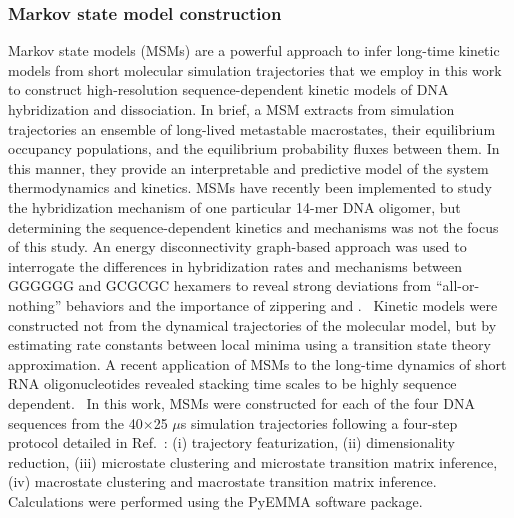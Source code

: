 \documentclass[journal=jpcbfk,manuscript=article]{achemso}
\newcommand*{\rood}[1]{{\color{red}{#1}}}
\begin{document}
\subsubsection{Markov state model construction}

Markov state models (MSMs) are a powerful approach to infer long-time kinetic models from short molecular simulation trajectories \citep{Sengupta2019AutomatedSelf-assembly, Pande2010EverythingAsk, Chodera2014MarkovDynamics, Husic2018MarkovScience, Wehmeyer2019IntroductionSoftware} that we employ in this work to construct high-resolution sequence-dependent kinetic models of DNA hybridization and dissociation. In brief, a MSM extracts from simulation trajectories an ensemble of long-lived metastable macrostates, their equilibrium occupancy populations, and the equilibrium probability fluxes between them. In this manner, they provide an interpretable and predictive model of the system thermodynamics and kinetics. MSMs have recently been implemented to study the hybridization mechanism of one particular 14-mer DNA oligomer, but determining the sequence-dependent kinetics and mechanisms was not the focus of this study.\citep{Jin2019} An energy disconnectivity graph-based approach was used to interrogate the differences in hybridization rates and mechanisms between GGGGGG and GCGCGC hexamers to reveal strong deviations from ``all-or-nothing'' behaviors and the importance of zippering and \rood{out-of-register diffusion mechanisms}.~\citep{Xiao2019} Kinetic models were constructed not from the dynamical trajectories of the molecular model, but by estimating rate constants between local minima using a transition state theory approximation. A recent application of MSMs to the long-time dynamics of short RNA oligonucleotides revealed stacking time scales to be highly sequence dependent.~\citep{Pinamonti2017} In this work, MSMs were constructed for each of the four DNA sequences \rood{at their respective melting temperatures} from the 40$\times$25 $\mu$s simulation trajectories following a four-step protocol detailed in Ref.~\citep{Sidky2019High-ResolutionVAMPnets}: (i) trajectory featurization, (ii) dimensionality reduction, (iii) microstate clustering and microstate transition matrix inference, (iv) macrostate clustering and macrostate transition matrix inference. Calculations were performed using the PyEMMA software package. \citep{Scherer2015PyEMMAModels}
\end{document}
